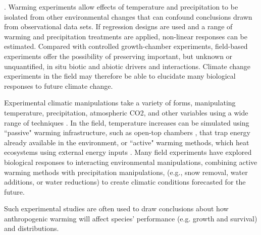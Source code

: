 \documentclass{article}
\begin{document}
\citep[e.g., ][]{box1978,gelman2014}. Warming experiments allow effects of temperature and  precipitation to be isolated from other  environmental changes that can confound conclusions drawn from observational data sets. If regression designs are used and a range of warming and precipitation treatments are applied, non-linear responses can be estimated. Compared with controlled growth-chamber experiments, field-based experiments offer the possibility of preserving important, but unknown or unquantified, in situ biotic and abiotic drivers and interactions. Climate change experiments in the field may therefore be able to elucidate many biological responses to future climate change.
\par Experimental climatic manipulations take a variety of forms, manipulating temperature, precipitation, atmospheric CO2, and other variables using a wide range of techniques \citep{shaver2000,aronson2009}. %
In the field, temperature increases can be simulated using ``passive" warming infrastructure, such as open-top chambers%
, that trap energy already available in the environment, or ``active" warming methods, which heat ecosystems using external energy inputs  \citep[e.g., gas-powered forced air heaters, electrical-powered soil warming cables, or infrared heaters;][]{shaver2000}. Many field experiments have explored biological responses to interacting environmental manipulations, combining active warming methods  with precipitation manipulations, (e.g., snow removal,  water additions, or water reductions) to create  climatic  conditions  forecasted for the  future\citep [e.g.,][]{price1998,cleland2006,sherry2007,rollinson2012}.
\par Such experimental studies are often used to draw conclusions  about how anthropogenic warming  will affect species' performance  (e.g. growth and  survival)  and  distributions\citep{dukes1999,hobbie1999,reich2015,gruner2016}.  %
\end{document}
